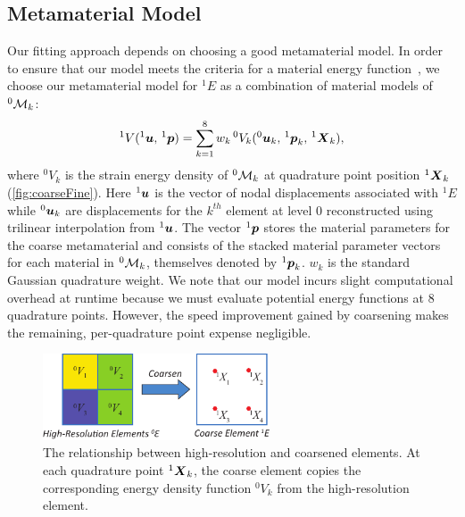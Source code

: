 \subsection{Metamaterial Model}
Our fitting approach depends on choosing a good metamaterial model.
In order to ensure that our model meets the criteria for a material energy function~\cite{Marsden2012}, we choose our metamaterial model for $^1\mathit{E}$ as a combination of material models of $^0\mathcal{M}_k$:
\begin{align}
^1V(^1\mbox{$\bm{u}$}, \, ^1\mbox{$\bm{p}$}) = \sum_{k=1}^8 w_k \, ^0V_k(^0\mbox{$\bm{u}$}_k, \, ^1\mbox{$\bm{p}$}_k, \, ^1\mbox{$\bm{X}$}_k),
\label{eq:materialModel}
\end{align}
where $^0V_k$ is the strain energy density of $^0\mathcal{M}_k$ at quadrature point position $^1\mbox{$\bm{X}$}_k$ (\autoref{fig:coarseFine}). Here $^1\mbox{$\bm{u}$}$ is the vector of nodal displacements associated with $^1\mathit{E}$ while $^0\mbox{$\bm{u}$}_k$ are displacements for the $k^{th}$ element at level $0$ reconstructed using trilinear interpolation from $^1\mbox{$\bm{u}$}$. The vector $^1\mbox{$\bm{p}$}$ stores the material parameters for the coarse metamaterial and consists of the stacked material parameter vectors for each material in $^0\mathcal{M}_k$, themselves denoted by $^1\mbox{$\bm{p}$}_k$.  $w_k$ is the standard Gaussian quadrature weight.
We note that our model incurs slight computational overhead at runtime because we must evaluate potential energy functions at 8 quadrature points.
However, the speed improvement gained by coarsening makes the remaining, per-quadrature point expense negligible.

\begin{figure}
	\centering
	\includegraphics[width=0.6\textwidth]{images/coarseFine.pdf}
	\caption{The relationship between high-resolution and coarsened elements. At each quadrature point $^1\mbox{$\bm{X}$}_k$, the coarse element copies the corresponding energy density function $^0V_k$ from the high-resolution element.}
	\label{fig:coarseFine}
\end{figure}

